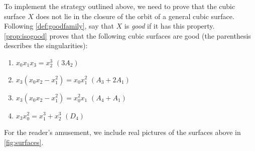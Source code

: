 \documentclass[12pt,reqno]{amsart}
\numberwithin{equation}{section}
\begin{document}
To implement the strategy outlined above, we need to prove that the cubic surface $X$ does not lie in the closure of the orbit of a general cubic surface.
Following \autoref{def:goodfamily}, say that $X$ is \emph{good} if it has this property.
\autoref{prop:isogood} proves that the following cubic surfaces are good (the parenthesis describes the singularities):
\begin{enumerate}
\item $x_0x_1x_3 = x_2^3$ \quad $(3A_2)$
\item $x_3(x_0x_2-x_1^2) = x_0x_1^2$ \quad $(A_3 + 2A_1)$
\item $x_3(x_0x_2-x_1^2) = x_0^2x_1$ \quad $(A_4 + A_1)$
\item $x_3x_0^2 = x_1^3 + x_2^3$ \quad $(D_4)$
\end{enumerate}
For the reader's amusement, we include real pictures of the surfaces above in \autoref{fig:surfaces}.
\end{document}
